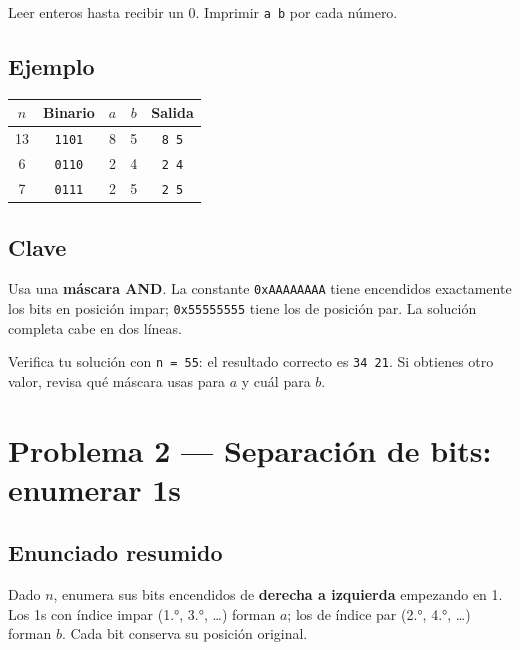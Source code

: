 \documentclass[12pt, oneside]{article}
\begin{document}
Leer enteros hasta recibir un 0.  Imprimir \texttt{a b} por cada número.

\subsection{Ejemplo}

\begin{center}
\begin{tabular}{ccccc}
  \toprule
  $n$ & Binario & $a$ & $b$ & Salida \\
  \midrule
  13 & \texttt{1101} & 8 & 5 & \texttt{8 5} \\
   6 & \texttt{0110} & 2 & 4 & \texttt{2 4} \\
   7 & \texttt{0111} & 2 & 5 & \texttt{2 5} \\
  \bottomrule
\end{tabular}
\end{center}

\subsection{Clave}

Usa una \textbf{máscara AND}.  La constante \texttt{0xAAAAAAAA} tiene encendidos
exactamente los bits en posición impar; \texttt{0x55555555} tiene los de posición
par.  La solución completa cabe en dos líneas.

\begin{consejo}
  Verifica tu solución con \texttt{n = 55}: el resultado correcto es
  \texttt{34 21}.  Si obtienes otro valor, revisa qué máscara usas para $a$ y
  cuál para $b$.
\end{consejo}

\newpage

\section{Problema 2 — Separación de bits: enumerar 1s}

\subsection{Enunciado resumido}

Dado $n$, enumera sus bits encendidos de \textbf{derecha a izquierda} empezando
en 1.  Los 1s con índice impar (1.°, 3.°, \ldots) forman $a$; los de índice par
(2.°, 4.°, \ldots) forman $b$.  Cada bit conserva su posición original.
\end{document}
